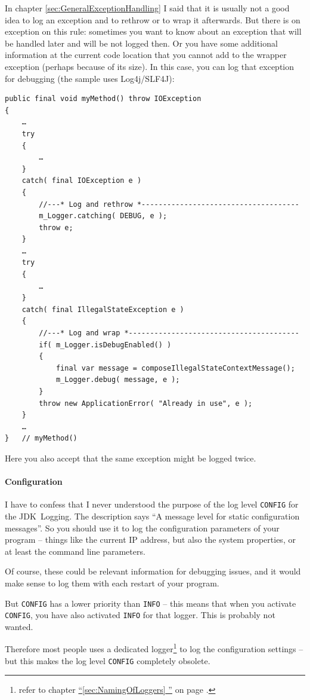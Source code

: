 \documentclass[11pt,a4paper, titlepage, parskip=half, headsepline, footsepline, cleardoublepage=current, headheight=1cm]{scrbook}
\newcommand*{\tqfullvref}[1]{\hyperref[{#1}]{“\ref*{#1} \nameref*{#1}”} on page \pageref{#1}}
\newcommand*{\tqref}[1]{\hyperref[{#1}]{\ref*{#1}}}
\begin{document}
In chapter \tqref{sec:GeneralExceptionHandling} I said that it is usually not a good idea to log an exception and to rethrow or to wrap it afterwards. But there is on exception on this rule: sometimes you want to know about an exception that will be handled later and will be not logged then. Or you have some additional information at the current code location that you cannot add to the wrapper exception (perhaps because of its size). In this case, you can log that exception for debugging (the sample uses Log4j/SLF4J): 
\begin{lstlisting}
public final void myMethod() throw IOException
{
    …
    try
    {
        …
    }
    catch( final IOException e )
    {
        //---* Log and rethrow *-------------------------------------
        m_Logger.catching( DEBUG, e );
        throw e;
    }
    …
    try
    {
        …
    }
    catch( final IllegalStateException e )
    {
        //---* Log and wrap *----------------------------------------
        if( m_Logger.isDebugEnabled() )
        {
            final var message = composeIllegalStateContextMessage();
            m_Logger.debug( message, e );
        }    
        throw new ApplicationError( "Already in use", e );
    }
    …
}   // myMethod()
\end{lstlisting}

Here you also accept that the same exception might be logged twice.

\paragraph{Configuration} I have to confess that I never understood the purpose of the log level \verb#CONFIG# for the JDK~Logging. The description says “A message level for static configuration messages”. So you should use it to log the configuration parameters of your program – things like the current IP address, but also the system properties, or at least the command line parameters.

Of course, these could be relevant information for debugging issues, and it would make sense to log them with each restart of your program.

But \verb#CONFIG# has a lower priority than \verb#INFO# – this means that when you activate \verb#CONFIG#, you have also activated \verb#INFO# for that logger. This is probably not wanted.

Therefore most people uses a dedicated logger\footnote{refer to chapter \tqfullvref{sec:NamingOfLoggers}.} to log the configuration settings – but this makes the log level \verb#CONFIG# completely obsolete.
\end{document}
